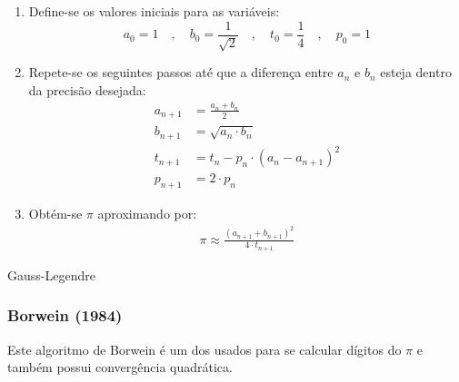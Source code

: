 \begin{algorithm}[H]
	\begin{enumerate}

		\item Define-se os valores iniciais para as variáveis:
		$$
			a_0 = 1 \quad, \quad b_0 = \frac{1}{\sqrt{2}} \quad, \quad t_0 = \frac{1}{4} \quad, \quad p_0 = 1
		$$

		\item Repete-se os seguintes passos até que a diferença entre $a_n$ e $b_n$
		esteja dentro da precisão desejada:
			\begin{align}
				a_{n+1} & = \frac{a_n + b_n}{2}               \label{eq:gs-1} \\[1em]
				b_{n+1} & = \sqrt{a_n \cdot b_n}              \label{eq:gs-2} \\[1em]
				t_{n+1} & = t_n - p_n \cdot (a_n - a_{n+1})^2 \label{eq:gs-3} \\[1em]
				p_{n+1} & = 2 \cdot p_n                       \label{eq:gs-4}
			\end{align}

		\item Obtém-se $\pi$ aproximando por:
			\begin{align}
				\pi \approx \frac{(a_{n+1} + b_{n+1})^2}{4 \cdot t_{n+1}}  \label{eq:gs-5}
			\end{align}

	\end{enumerate}
\caption{Gauss-Legendre \label{alg:gs}}
\end{algorithm}

\subsubsection{Borwein (1984)}

Este algoritmo de Borwein é um dos usados para se calcular dígitos do $\pi$ e também possui convergência quadrática.

